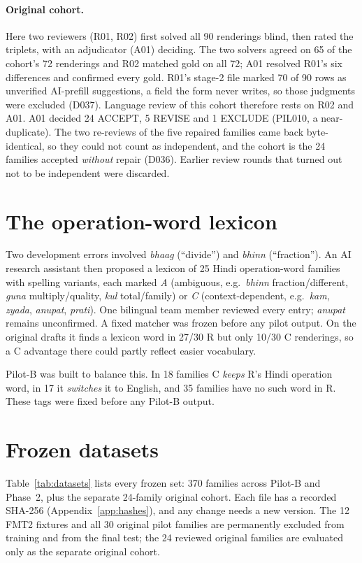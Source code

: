 \documentclass[12pt,a4paper,oneside]{report}
\renewcommand{\_}{\oldunderscore\allowbreak}
\begin{document}
\paragraph{Original cohort.} Here two reviewers (R01, R02) first solved all 90 renderings blind, then rated the triplets, with an adjudicator (A01) deciding. The two solvers agreed on 65 of the cohort's 72 renderings and R02 matched gold on all 72; A01 resolved R01's six differences and confirmed every gold. R01's stage-2 file marked 70 of 90 rows as unverified AI-prefill suggestions, a field the form never writes, so those judgments were excluded (D037). Language review of this cohort therefore rests on R02 and A01. A01 decided 24 ACCEPT, 5 REVISE and 1 EXCLUDE (PIL010, a near-duplicate). The two re-reviews of the five repaired families came back byte-identical, so they could not count as independent, and the cohort is the 24 families accepted \emph{without} repair (D036). Earlier review rounds that turned out not to be independent were discarded.

\section{The operation-word lexicon}
\label{sec:lexicon}

Two development errors involved \emph{bhaag} (``divide'') and \emph{bhinn} (``fraction''). An AI research assistant then proposed a lexicon of 25 Hindi operation-word families with spelling variants, each marked \emph{A} (ambiguous, e.g.\ \emph{bhinn} fraction/different, \emph{guna} multiply/quality, \emph{kul} total/family) or \emph{C} (context-dependent, e.g.\ \emph{kam}, \emph{zyada}, \emph{anupat}, \emph{prati}). One bilingual team member reviewed every entry; \emph{anupat} remains unconfirmed. A fixed matcher was frozen before any pilot output. On the original drafts it finds a lexicon word in 27/30 R but only 10/30 C renderings, so a C advantage there could partly reflect easier vocabulary.

Pilot-B was built to balance this. In 18 families C \emph{keeps} R's Hindi operation word, in 17 it \emph{switches} it to English, and 35 families have no such word in R. These tags were fixed before any Pilot-B output.

\section{Frozen datasets}

Table~\ref{tab:datasets} lists every frozen set: 370 families across Pilot-B and Phase~2, plus the separate 24-family original cohort. Each file has a recorded SHA-256 (Appendix~\ref{app:hashes}), and any change needs a new version. The 12 FMT2 fixtures and all 30 original pilot families are permanently excluded from training and from the final test; the 24 reviewed original families are evaluated only as the separate original cohort.
\end{document}
